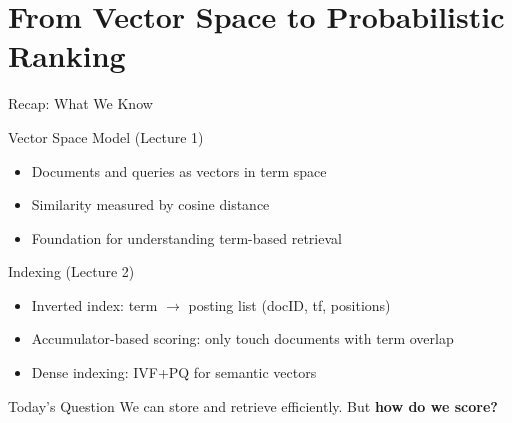 \documentclass[aspectratio=169]{beamer}
\newif\ifanimated
\newcommand{\cpause}{\ifanimated\pause\fi}
\begin{document}
\section{From Vector Space to Probabilistic Ranking}

\begin{frame}[plain]
\sectionpage
\end{frame}

\begin{frame}{Recap: What We Know}
\begin{block}{Vector Space Model (Lecture 1)}
\begin{itemize}
    \item Documents and queries as vectors in term space
    \item Similarity measured by cosine distance
    \item Foundation for understanding term-based retrieval
\end{itemize}\cpause
\end{block}

\begin{block}{Indexing (Lecture 2)}
\begin{itemize}
    \item Inverted index: term $\to$ posting list (docID, tf, positions)
    \item Accumulator-based scoring: only touch documents with term overlap
    \item Dense indexing: IVF+PQ for semantic vectors
\end{itemize}\cpause
\end{block}

\begin{alertblock}{Today's Question}
We can store and retrieve efficiently. But \textbf{how do we score?}
\end{alertblock}
\end{frame}
\end{document}
